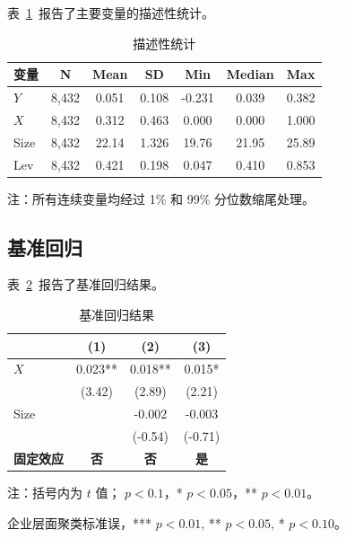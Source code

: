\documentclass[lang=cn, alanguage={chinese}, aaffiliation={中国}, aoptions={authoryear}]{ctexart}
\begin{document}
表~\ref{tab:desc_stat}~报告了主要变量的描述性统计。

\begin{table}[htbp]
    \centering
    \caption{描述性统计}
    \label{tab:desc_stat}
    \begin{threeparttable}
        \begin{tabular}{lcccccc}
            \toprule
            \textbf{变量} & \textbf{N} & \textbf{Mean} & \textbf{SD} & \textbf{Min} & \textbf{Median} & \textbf{Max} \\
            \midrule
            $Y$ & 8,432 & 0.051 & 0.108 & -0.231 & 0.039 & 0.382 \\
            $X$ & 8,432 & 0.312 & 0.463 & 0.000 & 0.000 & 1.000 \\
            Size & 8,432 & 22.14 & 1.326 & 19.76 & 21.95 & 25.89 \\
            Lev & 8,432 & 0.421 & 0.198 & 0.047 & 0.410 & 0.853 \\
            \bottomrule
        \end{tabular}
        \begin{tablenotes}\footnotesize
            \item 注：所有连续变量均经过 1\% 和 99\% 分位数缩尾处理。
        \end{tablenotes}
    \end{threeparttable}
\end{table}

\subsection{基准回归}
\label{sec:baseline}

表~\ref{tab:baseline}~报告了基准回归结果。

\begin{table}[htbp]
    \centering
    \caption{基准回归结果}
    \label{tab:baseline}
    \begin{threeparttable}
        \begin{tabular}{lccc}
            \toprule
            \textbf{} & \textbf{(1)} & \textbf{(2)} & \textbf{(3)} \\
            \midrule
            $X$ & 0.023\*** & 0.018\*** & 0.015\** \\
              & (3.42) & (2.89) & (2.21) \\
            Size & & -0.002 & -0.003 \\
              & & (-0.54) & (-0.71) \\
            \bottomrule
            \textbf{固定效应} & \textbf{否} & \textbf{否} & \textbf{是} \\
            \bottomrule
        \end{tabular}
        \begin{tablenotes}\footnotesize
            \item 注：括号内为 $t$ 值；\* $p<0.1$，\** $p<0.05$，\*** $p<0.01$。
            \item 企业层面聚类标准误，*** $p<0.01$, ** $p<0.05$, * $p<0.10$。
        \end{tablenotes}
    \end{threeparttable}
\end{table}
\end{document}
